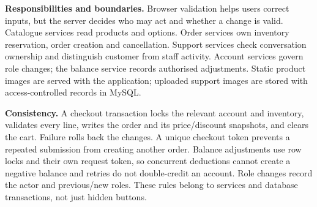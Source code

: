 \documentclass[11pt,a4paper]{article}
\begin{document}
\textbf{Responsibilities and boundaries.} Browser validation helps users correct inputs, but the server decides who may act and whether a change is valid. Catalogue services read products and options. Order services own inventory reservation, order creation and cancellation. Support services check conversation ownership and distinguish customer from staff activity. Account services govern role changes; the balance service records authorised adjustments. Static product images are served with the application; uploaded support images are stored with access-controlled records in MySQL.

\textbf{Consistency.} A checkout transaction locks the relevant account and inventory, validates every line, writes the order and its price/discount snapshots, and clears the cart. Failure rolls back the changes. A unique checkout token prevents a repeated submission from creating another order. Balance adjustments use row locks and their own request token, so concurrent deductions cannot create a negative balance and retries do not double-credit an account. Role changes record the actor and previous/new roles. These rules belong to services and database transactions, not just hidden buttons.
\end{document}

